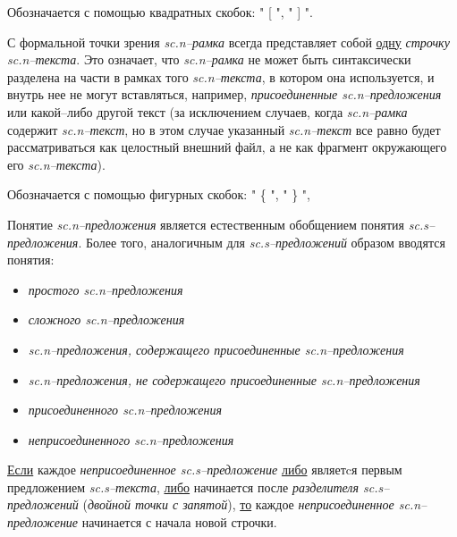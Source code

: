 \begin{SCn}
\end{SCn}

Обозначается с помощью квадратных скобок: " [ "{}, " ] "{}.

С формальной точки зрения \textit{sc.n--рамка} всегда представляет собой \uline{одну} \textit{строчку sc.n--текста}. Это означает, что \textit{sc.n--рамка} не может быть синтаксически разделена на части в рамках того \textit{sc.n--текста}, в котором она используется, и внутрь нее не могут вставляться, например, \textit{присоединенные sc.n--предложения} или какой--либо другой текст (за исключением случаев, когда \textit{sc.n--рамка} содержит \textit{sc.n--текст}, но в этом случае указанный \textit{sc.n--текст} все равно будет рассматриваться как целостный внешний файл, а не как фрагмент окружающего его \textit{sc.n--текста}). 

\begin{SCn}
\end{SCn}

Обозначается с помощью фигурных скобок: " \{ "{}, " \} "{},



Понятие \textit{sc.n--предложения} является естественным обобщением понятия \textit{sc.s--предложения}. Более того, аналогичным для \textit{sc.s--предложений} образом вводятся понятия:
\begin{itemize}
	\item \textit{простого sc.n--предложения}
	\item \textit{сложного sc.n--предложения}
	\item \textit{sc.n--предложения, содержащего присоединенные sc.n--предложения}
	\item \textit{sc.n--предложения, не содержащего присоединенные sc.n--предложения}
	\item \textit{присоединенного sc.n--предложения}
	\item \textit{неприсоединенного sc.n--предложения}
\end{itemize}

\uline{Если} каждое \textit{неприсоединенное sc.s--предложение} \uline{либо} являетcя первым предложением \textit{sc.s--текста}, \uline{либо} начинается после \textit{разделителя sc.s--предложений} (\textit{двойной точки с запятой}), \uline{то} каждое \textit{неприсоединенное sc.n--предложение} начинается с начала новой строчки.

